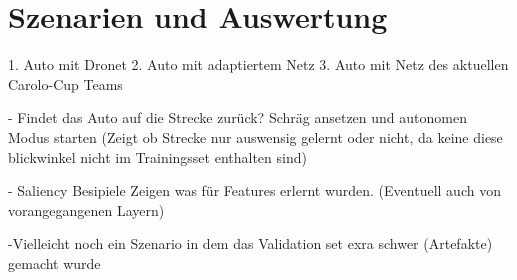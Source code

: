 %
\chapter{Szenarien und Auswertung}


1. Auto mit Dronet 
2. Auto mit adaptiertem Netz
3. Auto mit Netz des aktuellen Carolo-Cup Teams 

- Findet das Auto auf die Strecke zurück? Schräg ansetzen und autonomen Modus starten
(Zeigt ob Strecke nur auswensig gelernt oder nicht, da keine diese blickwinkel nicht im Trainingsset enthalten sind)

- Saliency Besipiele Zeigen was für Features erlernt wurden. (Eventuell auch von vorangegangenen Layern)

-Vielleicht noch ein Szenario in dem das Validation set exra schwer (Artefakte) gemacht wurde
